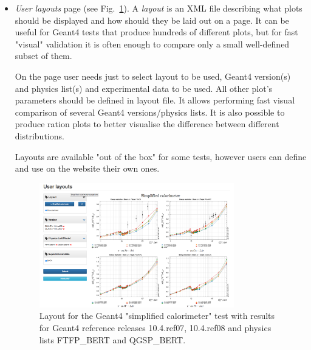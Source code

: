 \begin{itemize}
\item \textit{User layouts} page (see Fig.~\ref{fig:layouts}). A \textit{layout} is an XML file describing what plots should be displayed and how should they be laid out on a page. It can be useful for Geant4 tests that produce hundreds of different plots, but for fast "visual" validation it is often enough to compare only a small well-defined subset of them. 

On the page user needs just to select layout to be used, Geant4 version(s) and physics list(s) and experimental data to be used. All other plot's parameters should be defined in layout file. It allows performing fast visual comparison of several Geant4 versions/physics lists. It is also possible to produce ration plots to better visualise the difference between different distributions.

Layouts are available "out of the box" for some tests, however users can define and use on the website their own ones.

\begin{figure}[h]
    \centering
    \includegraphics[width=0.8\textwidth,clip]{layout_sc.png}
    \caption{Layout for the Geant4 "simplified calorimeter" test with results for Geant4 reference releases 10.4.ref07, 10.4.ref08 and physics lists FTFP\_BERT and QGSP\_BERT.}
    \label{fig:layouts}
\end{figure}

\end{itemize}

